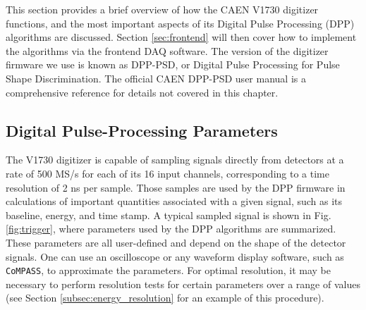 This section provides a brief overview of how the CAEN V1730 digitizer functions, and the most important aspects of its Digital Pulse Processing (DPP) algorithms are discussed. Section \ref{sec:frontend} will then cover how to implement the algorithms via the frontend DAQ software. The version of the digitizer firmware we use is known as DPP-PSD, or Digital Pulse Processing for Pulse Shape Discrimination. The official CAEN DPP-PSD user manual is a comprehensive reference for details not covered in this chapter. 


\subsection{Digital Pulse-Processing Parameters} \label{subsec:DPP}

The V1730 digitizer is capable of sampling signals directly from detectors at a rate of 500 MS/s for each of its 16 input channels, corresponding to a time resolution of 2 ns per sample. Those samples are used by the DPP firmware in calculations of important quantities associated with a given signal, such as its baseline, energy, and time stamp. A typical sampled signal is shown in Fig. \ref{fig:trigger}, where parameters used by the DPP algorithms are summarized. These parameters are all user-defined and depend on the shape of the detector signals. One can use an oscilloscope or any waveform display software, such as \texttt{CoMPASS}, to approximate the parameters. For optimal resolution, it may be necessary to perform resolution tests for certain parameters over a range of values (see Section \ref{subsec:energy_resolution} for an example of this procedure).


